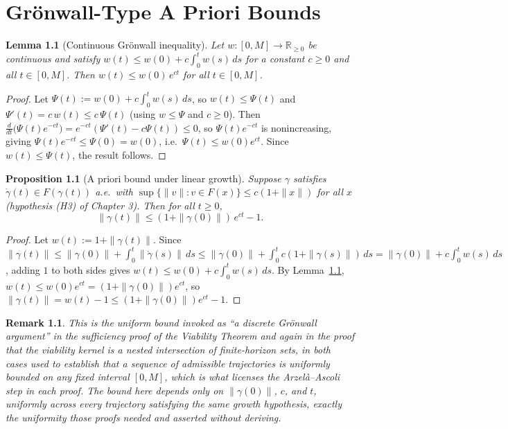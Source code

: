 \documentclass[11pt]{report}
\newtheorem{proposition}{Proposition}[chapter]
\newtheorem{lemma}{Lemma}[chapter]
\newtheorem{remark}{Remark}[chapter]
\begin{document}
\chapter{Gr\"onwall-Type A Priori Bounds}

\begin{lemma}[Continuous Gr\"onwall inequality]
\label{lem:gronwall}
Let $w : [0,M] \to \mathbb{R}_{\geq 0}$ be continuous and satisfy
$w(t) \leq w(0) + c\int_0^t w(s)\, ds$ for a constant $c \geq 0$ and all
$t \in [0,M]$. Then $w(t) \leq w(0)\, e^{ct}$ for all $t \in [0,M]$.
\end{lemma}
\begin{proof}
Let $\Psi(t) := w(0) + c\int_0^t w(s)\,ds$, so $w(t) \leq \Psi(t)$ and
$\Psi'(t) = c\,w(t) \leq c\,\Psi(t)$ (using $w \leq \Psi$ and $c \geq 0$).
Then $\frac{d}{dt}\big(\Psi(t) e^{-ct}\big) = e^{-ct}(\Psi'(t) - c\Psi(t)) \leq 0$,
so $\Psi(t)e^{-ct}$ is nonincreasing, giving
$\Psi(t)e^{-ct} \leq \Psi(0) = w(0)$, i.e.\ $\Psi(t) \leq w(0)e^{ct}$.
Since $w(t) \leq \Psi(t)$, the result follows.
\end{proof}

\begin{proposition}[A priori bound under linear growth]
\label{prop:apriori}
Suppose $\gamma$ satisfies $\dot\gamma(t) \in F(\gamma(t))$ a.e.\ with
$\sup\{\|v\| : v \in F(x)\} \leq c(1+\|x\|)$ for all $x$ (hypothesis
(H3) of Chapter 3). Then for all $t \geq 0$,
\[
\|\gamma(t)\| \leq (1 + \|\gamma(0)\|)\, e^{ct} - 1.
\]
\end{proposition}
\begin{proof}
Let $w(t) := 1 + \|\gamma(t)\|$. Since
$\|\gamma(t)\| \leq \|\gamma(0)\| + \int_0^t \|\dot\gamma(s)\|\, ds \leq
\|\gamma(0)\| + \int_0^t c(1+\|\gamma(s)\|)\, ds = \|\gamma(0)\| + c\int_0^t w(s)\, ds$,
adding $1$ to both sides gives $w(t) \leq w(0) + c\int_0^t w(s)\, ds$.
By Lemma~\ref{lem:gronwall}, $w(t) \leq w(0)e^{ct} = (1+\|\gamma(0)\|)e^{ct}$,
so $\|\gamma(t)\| = w(t) - 1 \leq (1+\|\gamma(0)\|)e^{ct} - 1$.
\end{proof}

\begin{remark}
This is the uniform bound invoked as ``a discrete Gr\"onwall argument''
in the sufficiency proof of the Viability Theorem and again in the
proof that the viability kernel is a nested intersection of
finite-horizon sets, in both cases used to establish that a sequence
of admissible trajectories is uniformly bounded on any fixed interval
$[0,M]$, which is what licenses the Arzel\`a--Ascoli step in each
proof. The bound here depends only on $\|\gamma(0)\|$, $c$, and $t$,
uniformly across every trajectory satisfying the same growth
hypothesis, exactly the uniformity those proofs needed and asserted
without deriving.
\end{remark}
\end{document}
